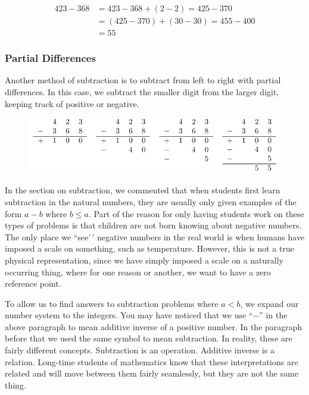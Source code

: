 \documentclass[
]{book}
\theoremstyle{definition}
\theoremstyle{definition}
\theoremstyle{definition}
\theoremstyle{definition}
\theoremstyle{remark}
\begin{document}
\begin{align*}
423-368 &= 423-368 + (2-2) = 425-370 \\
  &= (425-370) + (30-30) = 455-400 \\
  &= 55
\end{align*}

\hypertarget{partial-differences}{%
\subsubsection*{Partial Differences}\label{partial-differences}}

Another method of subtraction is to subtract from left to right with partial differences. In this case, we subtract the smaller digit from the larger digit, keeping track of positive or negative.

\begin{figure}

{\centering \includegraphics[width=0.8\linewidth]{tikz/subtraction-model-partial-differences} 

}

\end{figure}

In the section on subtraction, we commented that when students first learn subtraction in the natural numbers, they are usually only given examples of the form \(a-b\) where \(b\leq a\). Part of the reason for only having students work on these types of problems is that children are not born knowing about negative numbers. The only place we ``see'\,' negative numbers in the real world is when humans have imposed a scale on something, such as temperature. However, this is not a true physical representation, since we have simply imposed a scale on a naturally occurring thing, where for one reason or another, we want to have a zero reference point.

To allow us to find answers to subtraction problems where \(a<b\), we expand our number system to the integers.
You may have noticed that we use ``\(-\)'' in the above paragraph to mean additive inverse of a positive number. In the paragraph before that we used the same symbol to mean subtraction. In reality, these are fairly different concepts. Subtraction is an operation. Additive inverse is a relation. Long-time students of mathematics know that these interpretations are related and will move between them fairly seamlessly, but they are not the same thing.
\end{document}
